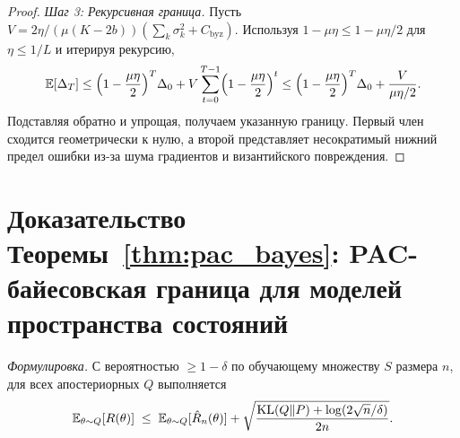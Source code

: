 \begin{proof}
\textit{Шаг 3: Рекурсивная граница.} Пусть $V = 2\eta/(\mu(K{-}2b))(\sum_k\sigma_k^2 + C_{\mathrm{byz}})$. Используя $1-\mu\eta\le 1-\mu\eta/2$ для $\eta\le 1/L$ и итерируя рекурсию,
\begin{equation}
\mathbb{E}[\Delta_T]
\le \Bigl(1-\frac{\mu\eta}{2}\Bigr)^T \Delta_0 + V\sum_{t=0}^{T-1}\Bigl(1-\frac{\mu\eta}{2}\Bigr)^t
\le \Bigl(1-\frac{\mu\eta}{2}\Bigr)^T \Delta_0 + \frac{V}{\mu\eta/2}.
\end{equation}
Подставляя обратно и упрощая, получаем указанную границу. Первый член сходится геометрически к нулю, а второй представляет несократимый нижний предел ошибки из-за шума градиентов и византийского повреждения.
\end{proof}


\section{Доказательство Теоремы~\ref{thm:pac_bayes}: PAC-байесовская граница для моделей пространства состояний}
\label{app:proof_pac}

\noindent\textit{Формулировка.} С вероятностью $\ge 1-\delta$ по
обучающему множеству $S$ размера $n$, для всех апостериорных $Q$
выполняется
\begin{equation*}
\mathbb{E}_{\theta\sim Q}[R(\theta)]\;\le\;\mathbb{E}_{\theta\sim Q}[\hat{R}_n(\theta)]
+ \sqrt{\frac{\mathrm{KL}(Q\|P)+\log(2\sqrt{n}/\delta)}{2n}}.
\end{equation*}

